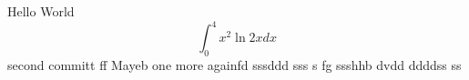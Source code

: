\documentclass{article}
\begin{document}
Hello World
$$\int_0^4 x^2 \ln{2x}dx$$
second committ  ff
Mayeb
one more
againfd
sssddd sss
s fg
ssshhb dvdd ddddss ss
\end{document}
